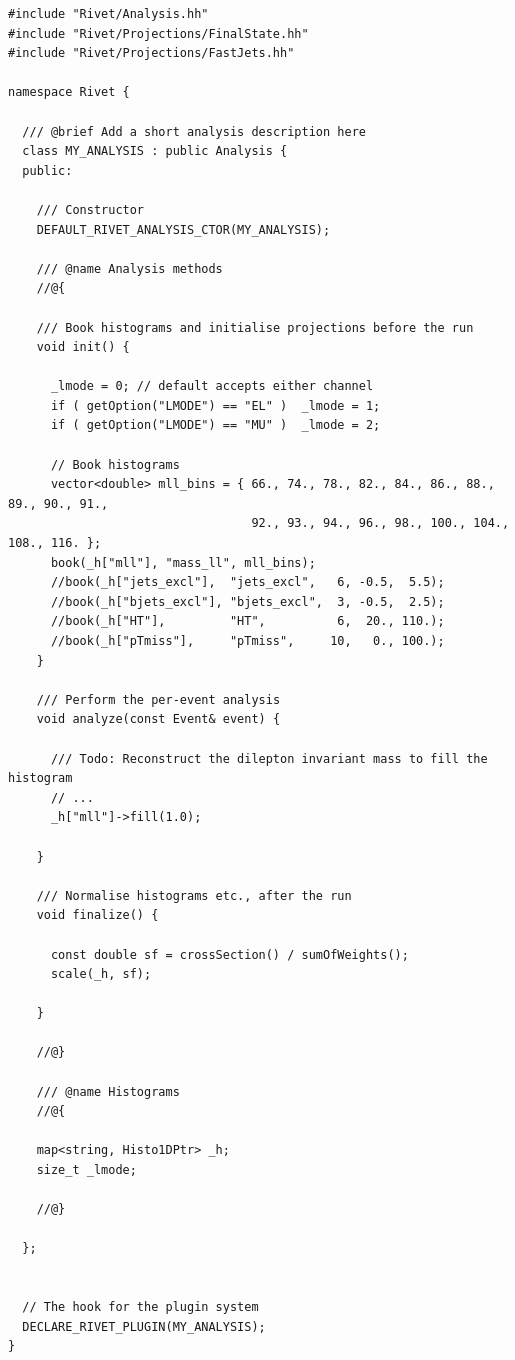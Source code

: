 \documentclass[10pt,fleqn]{scrartcl}
\theoremstyle{exstyle}
\begin{document}
\clearpage
\newpage
\begin{footnotesize}
\begin{verbatim}
#include "Rivet/Analysis.hh"
#include "Rivet/Projections/FinalState.hh"
#include "Rivet/Projections/FastJets.hh"

namespace Rivet {

  /// @brief Add a short analysis description here
  class MY_ANALYSIS : public Analysis {
  public:

    /// Constructor
    DEFAULT_RIVET_ANALYSIS_CTOR(MY_ANALYSIS);

    /// @name Analysis methods
    //@{

    /// Book histograms and initialise projections before the run
    void init() {

      _lmode = 0; // default accepts either channel
      if ( getOption("LMODE") == "EL" )  _lmode = 1;
      if ( getOption("LMODE") == "MU" )  _lmode = 2;

      // Book histograms
      vector<double> mll_bins = { 66., 74., 78., 82., 84., 86., 88., 89., 90., 91.,
                                  92., 93., 94., 96., 98., 100., 104., 108., 116. };
      book(_h["mll"], "mass_ll", mll_bins);
      //book(_h["jets_excl"],  "jets_excl",   6, -0.5,  5.5);
      //book(_h["bjets_excl"], "bjets_excl",  3, -0.5,  2.5);
      //book(_h["HT"],         "HT",          6,  20., 110.);
      //book(_h["pTmiss"],     "pTmiss",     10,   0., 100.);
    }

    /// Perform the per-event analysis
    void analyze(const Event& event) {

      /// Todo: Reconstruct the dilepton invariant mass to fill the histogram
      // ...
      _h["mll"]->fill(1.0);

    }

    /// Normalise histograms etc., after the run
    void finalize() {

      const double sf = crossSection() / sumOfWeights();
      scale(_h, sf);

    }

    //@}

    /// @name Histograms
    //@{

    map<string, Histo1DPtr> _h;
    size_t _lmode;

    //@}

  };


  // The hook for the plugin system
  DECLARE_RIVET_PLUGIN(MY_ANALYSIS);
}
\end{verbatim}
\end{footnotesize}
\clearpage
\newpage
\end{document}
